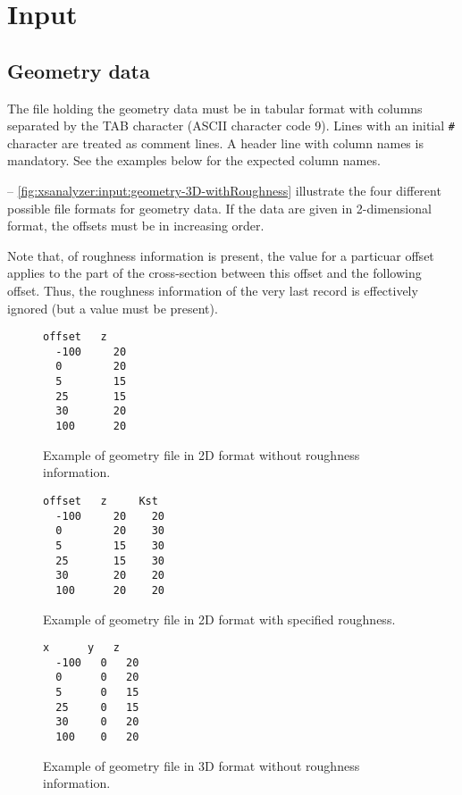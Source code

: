\section{Input} \label{sec:xsanalyzer:input}

\subsection{Geometry data} \label{sec:xsanalyzer:input:geometry}
The file holding the geometry data must be in tabular format with columns separated by the TAB character (ASCII character code 9). Lines with an initial \verb!#! character are treated as comment lines. A header line with column names is mandatory. See the examples below for the expected column names.

 -- \ref{fig:xsanalyzer:input:geometry-3D-withRoughness} illustrate the four different possible file formats for geometry data. If the data are given in 2-dimensional format, the offsets must be in increasing order.

Note that, of roughness information is present, the value for a particuar offset applies to the part of the cross-section between this offset and the following offset. Thus, the roughness information of the very last record is effectively ignored (but a value must be present).

\begin{figure}
\begin{lstlisting}[style=txt]
  offset   z
  -100     20
  0        20
  5        15
  25       15
  30       20
  100      20
\end{lstlisting}
  \caption{Example of geometry file in 2D format without roughness information. \label{fig:xsanalyzer:input:geometry-2D-withoutRoughness}}
\end{figure}

\begin{figure}
\begin{lstlisting}[style=txt]
  offset   z     Kst
  -100     20    20
  0        20    30
  5        15    30
  25       15    30
  30       20    20
  100      20    20
\end{lstlisting}
  \caption{Example of geometry file in 2D format with specified roughness. \label{fig:xsanalyzer:input:geometry-2D-withRoughness}}
\end{figure}

\begin{figure}
\begin{lstlisting}[style=txt]
  x      y   z
  -100   0   20
  0      0   20
  5      0   15
  25     0   15
  30     0   20
  100    0   20
\end{lstlisting}
  \caption{Example of geometry file in 3D format without roughness information. \label{fig:xsanalyzer:input:geometry-3D-withoutRoughness}}
\end{figure}

